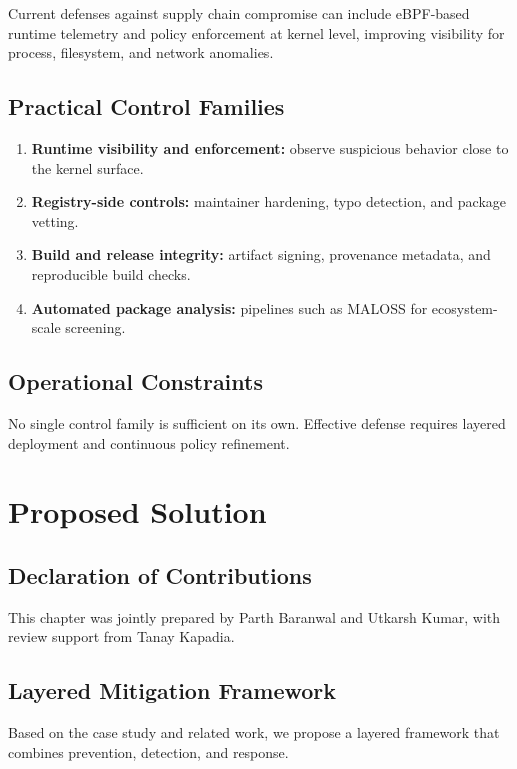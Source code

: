 Current defenses against supply chain compromise can include eBPF-based runtime telemetry and
policy enforcement at kernel level, improving visibility for process, filesystem,
and network anomalies.

\section{Practical Control Families}

\begin{enumerate}
\item \textbf{Runtime visibility and enforcement:} observe suspicious behavior close to the kernel surface.
\item \textbf{Registry-side controls:} maintainer hardening, typo detection, and package vetting.
\item \textbf{Build and release integrity:} artifact signing, provenance metadata, and reproducible build checks.
\item \textbf{Automated package analysis:} pipelines such as MALOSS for ecosystem-scale screening.
\end{enumerate}

\section{Operational Constraints}

No single control family is sufficient on its own.
Effective defense requires layered deployment and continuous policy refinement.

\chapter{Proposed Solution}
\label{ch:proposed-solution}

\section*{Declaration of Contributions}
This chapter was jointly prepared by Parth Baranwal and Utkarsh Kumar,
with review support from Tanay Kapadia.

\section{Layered Mitigation Framework}

Based on the case study and related work, we propose a layered framework that combines
prevention, detection, and response.

